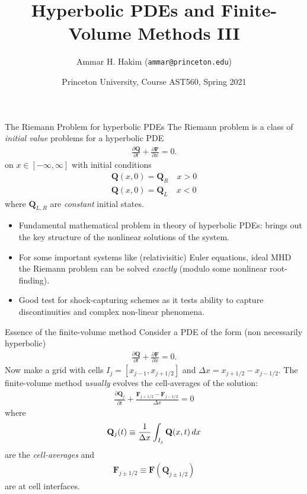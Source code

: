 \documentclass[aspectratio=169]{beamer}
\title[{\tt }]{Hyperbolic PDEs and Finite-Volume Methods III}%
\author[https://ast560.rtfd.io]%
{Ammar H. Hakim ({\tt ammar@princeton.edu}) \inst{1}}%
\institute[PPPL]
{ \inst{1} Princeton Plasma Physics Laboratory, Princeton, NJ %
}
\date[3/18/2021]{Princeton University, Course AST560, Spring 2021}
\newcommand{\pfrac}[2]{\frac{\partial #1}{\partial #2}}
\newcommand{\mvec}[1]{\mathbf{#1}}
\begin{document}
\begin{frame}[plain]
  \titlepage
\end{frame}

\begin{frame}{The Riemann Problem for hyperbolic PDEs}
  \small%
  The Riemann problem is a class of \emph{initial value} problems for
  a hyperbolic PDE
  \begin{align*}
    \pfrac{\mvec{Q}}{t} + \pfrac{\mvec{F}}{x} = 0.
  \end{align*}
  on $x\in[-\infty,\infty]$ with initial conditions
  \begin{align*}
    \mvec{Q}(x,0) = \mvec{Q}_R \quad x>0 \\
    \mvec{Q}(x,0) = \mvec{Q}_L \quad x<0    
  \end{align*}
  where $\mvec{Q}_{L,R}$ are \emph{constant} initial states.%
  \begin{itemize}
  \item Fundamental mathematical problem in theory of hyperbolic PDEs:
    brings out the key structure of the nonlinear solutions of the
    system.
  \item For some important systems like (relativisitic) Euler
    equations, ideal MHD the Riemann problem can be solved
    \emph{exactly} (modulo some nonlinear root-finding).
  \item Good test for shock-capturing schemes as it tests ability to
    capture discontinuities and complex non-linear phenomena.
  \end{itemize}
\end{frame}  

\begin{frame}{Essence of the finite-volume method}
  \small%
  Consider a PDE of the form (non necessarily hyperbolic)
  \begin{align*}
    \pfrac{\mvec{Q}}{t} + \pfrac{\mvec{F}}{x} = 0.    
  \end{align*}
  Now make a grid with cells $I_j = [x_{j-1},x_{j+1/2}]$ and
  $\Delta x = x_{j+1/2} - x_{j-1/2}$. The finite-volume method
  \emph{usually} evolves the cell-averages of the solution:
  \begin{align*}
    \pfrac{\mvec{Q}_j}{t} + \frac{\mvec{F}_{j+1/2} -\mvec{F}_{j-1/2} }{\Delta x} = 0
  \end{align*}
  where
  \begin{align*}
    \mvec{Q}_j(t) \equiv \frac{1}{\Delta x}\int_{I_j} \mvec{Q}(x,t) \thinspace dx
  \end{align*}
  are the \emph{cell-averages} and
  \begin{align*}
    \mvec{F}_{j\pm 1/2} \equiv \mvec{F}(\mvec{Q}_{j\pm 1/2})
  \end{align*}
  are at cell interfaces.

\end{frame}
\end{document}
